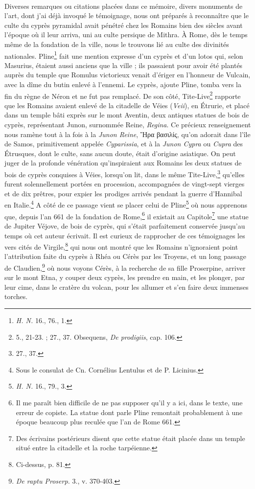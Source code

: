 \documentclass{article}
\begin{document}
\paragraph{}
Diverses remarques ou citations placées dans ce mémoire, divers monuments de l'art, dont j'ai déjà invoqué le témoignage, nous ont préparés à reconnaître que le culte du cyprès pyramidal avait pénétré chez les Romains bien des siècles avant l'époque où il leur arriva, uni au culte persique de Mithra. À Rome, dès le temps même de la fondation de la ville, nous le trouvons lié au culte des divinités nationales. Pline\footnote{\emph{H. N.} 16., 76., 1.} fait une mention expresse d'un cyprès et d'un lotos qui, selon Masurius, étaient aussi anciens que la ville ; ils passaient pour avoir été plantés auprès du temple que Romulus victorieux venait d'ériger en l'honneur de Vulcain, avec la dîme du butin enlevé à l'ennemi. Le cyprès, ajoute Pline, tomba vers la fin du règne de Néron et ne fut pas remplacé. De son côté, Tite-Live\footnote{5., 21-23. ; 27., 37. Obsequens, \emph{De prodigiis}, cap. 106.} rapporte que les Romains avaient enlevé de la citadelle de Véies (\emph{Veii}), en Étrurie, et placé dans un temple bâti exprès sur le mont Aventin, deux antiques statues de bois de cyprès, représentant Junon, surnommée Reine, \emph{Regina}. Ce précieux renseignement nous ramène tout à la fois à la \emph{Junon Reine}, \textgreek{Ἥρα βασιλίς}, qu'on adorait dans l'île de Samos, primitivement appelée \emph{Cyparissia}, et à la \emph{Junon Cypra} ou \emph{Cupra} des Étrusques, dont le culte, sans aucun doute, était d'origine asiatique. On peut juger de la profonde vénération qu'inspiraient aux Romains les deux statues de bois de cyprès conquises à Véies, lorsqu'on lit, dans le même Tite-Live,\footnote{27., 37.} qu'elles furent solennellement portées en procession, accompagnées de vingt-sept vierges et de dix prêtres, pour expier les prodiges arrivés pendant la guerre d'Hannibal en Italie.\footnote{Sous le consulat de Cn. Cornélius Lentulus et de P. Licinius.} A côté de ce passage vient se placer celui de Pline\footnote{\emph{H. N.} 16., 79., 3.} où nous apprenons que, depuis l'an 661 de la fondation de Rome,\footnote{Il me paraît bien difficile de ne pas supposer qu'il y a ici, dans le texte, une erreur de copiste. La statue dont parle Pline remontait probablement à une époque beaucoup plus reculée que l'an de Rome 661.} il existait au Capitole\footnote{Des écrivains postérieurs disent que cette statue était placée dans un temple situé entre la citadelle et la roche tarpéienne.} une statue de Jupiter Véjove, de bois de cyprès, qui s'était parfaitement conservée jusqu'au temps où cet auteur écrivait. Il est curieux de rapprocher de ces témoignages les vers cités de Virgile,\footnote{Ci-dessus, p. 81.} qui nous ont montré que les Romains n'ignoraient point l'attribution faite du cyprès à Rhéa ou Cérès par les Troyens, et un long passage de Claudien,\footnote{\emph{De raptu Proserp.} 3., v. 370-403.} où nous voyons Cérès, à la recherche de sa fille Proserpine, arriver sur le mont Etna, y couper deux cyprès, les prendre en main, et les plonger, par leur cime, dans le cratère du volcan, pour les allumer et s'en faire deux immenses torches.
\end{document}

